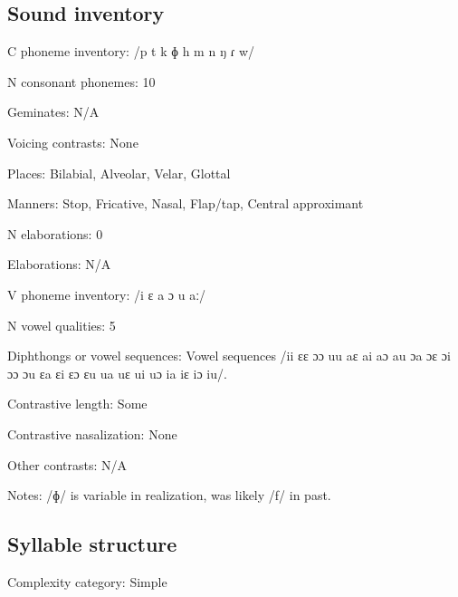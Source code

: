 {\subsection*{Sound inventory}
\begin{appendixdesc}

\item[C phoneme inventory:] /p t k ɸ h m n ŋ ɾ w/

\item[N consonant phonemes:] 10

\item[Geminates:] N/A

\item[Voicing contrasts:] None

\item[Places:] Bilabial, Alveolar, Velar, Glottal

\item[Manners:] Stop, Fricative, Nasal, Flap/tap, Central approximant

\item[N elaborations:] 0

\item[Elaborations:] N/A

\item[V phoneme inventory:] /i ɛ a ɔ u aː/

\item[N vowel qualities:] 5

\item[Diphthongs or vowel sequences:] Vowel sequences /ii ɛɛ ɔɔ uu aɛ ai aɔ au ɔa ɔɛ ɔi ɔɔ ɔu ɛa ɛi ɛɔ ɛu ua uɛ ui uɔ ia iɛ iɔ iu/.

\item[Contrastive length:] Some

\item[Contrastive nasalization:] None

\item[Other contrasts:] N/A

\item[Notes:] /ɸ/ is variable in realization, was likely /f/ in past.
\end{appendixdesc}
\subsection*{Syllable structure}
\begin{appendixdesc}

\item[Complexity category:] Simple


\end{appendixdesc}}
